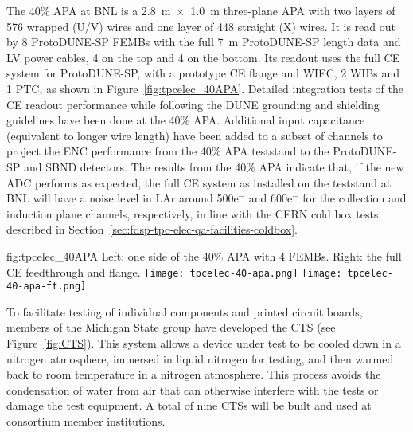 The 40\% APA at BNL is a 2.8~m~$\times$~1.0~m three-plane APA with two layers of 576 wrapped (U/V) wires and one layer of 448 straight (X) wires. It is read out by 8 ProtoDUNE-SP FEMBs with the full 7~m ProtoDUNE-SP length data and LV power cables, 4 on the top and 4 on the bottom. Its readout uses the full CE system for ProtoDUNE-SP, with a prototype CE flange and WIEC, 2 WIBs and 1 PTC, as shown in Figure~\ref{fig:tpcelec_40APA}. Detailed integration tests of the CE readout performance while following the DUNE grounding and shielding guidelines have been done at the 40\% APA. Additional input capacitance (equivalent to longer wire length) have been added to a subset of channels to project the ENC performance from the 40\% APA teststand to the ProtoDUNE-SP and SBND detectors. The results from the 40\% APA indicate that, if the new ADC performs as expected, the full CE system as installed on the teststand at BNL will have a noise level in LAr around 500e$^-$ and 600e$^-$ for the collection and induction plane channels, respectively, in line with the CERN cold box tests described in Section~\ref{sec:fdsp-tpc-elec-qa-facilities-coldbox}.

\begin{dunefigure}
{fig:tpcelec_40APA}
{Left: one side of the 40\% APA with 4 FEMBs.  Right: the full CE feedthrough and flange.}
\texttt{[image: tpcelec-40-apa.png]}
\hspace{3mm}
\texttt{[image: tpcelec-40-apa-ft.png]}
\end{dunefigure}


To facilitate testing of individual components and printed circuit boards, members of the Michigan State group have developed the CTS (see Figure~\ref{fig:CTS}).  This system allows a device under test to be cooled down in a nitrogen atmosphere, immersed in liquid nitrogen for testing, and then warmed back to room temperature in a nitrogen atmosphere.  This process avoids the condensation of water from air that can otherwise interfere with the tests or damage the test equipment.  A total of nine CTSs will be built and used at consortium member institutions.

